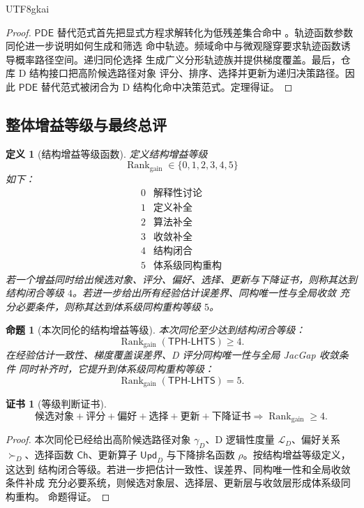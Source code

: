 \documentclass[12pt]{article}
\newtheorem{definition}{定义}[section]
\newtheorem{proposition}{命题}[section]
\newtheorem{Certificate}{证书}[section]
\newcommand{\TPHLHTS}{\ensuremath{\mathsf{TPH\mbox{-}LHTS}}}
\newcommand{\PDE}{\ensuremath{\mathsf{PDE}}}
\begin{document}
\begin{CJK*}{UTF8}{gkai}
\begin{proof}
\(\PDE\) 替代范式首先把显式方程求解转化为低残差集合命中
\cite{RepoTex55PDEParadigm}。轨迹函数参数同伦进一步说明如何生成和筛选
命中轨迹。频域命中与微观隧穿要求轨迹函数诱导概率路径空间。递归同伦选择
生成广义分形轨迹族并提供梯度覆盖。最后，仓库 D 结构接口把高阶候选路径对象
评分、排序、选择并更新为递归决策路径。因此 \(\PDE\) 替代范式被闭合为
D 结构化命中决策范式。定理得证。
\end{proof}

\subsection{整体增益等级与最终总评}
\label{subsec:total-gain-rank-final-statement}

\begin{definition}[结构增益等级函数]
定义结构增益等级
\[
\operatorname{Rank}_{\mathrm{gain}}\in\{0,1,2,3,4,5\}
\]
如下：
\[
\begin{array}{c|l}
0 & \text{解释性讨论}\\
1 & \text{定义补全}\\
2 & \text{算法补全}\\
3 & \text{收敛补全}\\
4 & \text{结构闭合}\\
5 & \text{体系级同构重构}
\end{array}
\]
若一个增益同时给出候选对象、评分、偏好、选择、更新与下降证书，则称其达到
结构闭合等级 \(4\)。若进一步给出所有经验估计误差界、同构唯一性与全局收敛
充分必要条件，则称其达到体系级同构重构等级 \(5\)。
\end{definition}

\begin{proposition}[本次同伦的结构增益等级]
本次同伦至少达到结构闭合等级：
\[
\boxed{
\operatorname{Rank}_{\mathrm{gain}}(\TPHLHTS)\ge4.
}
\]
在经验估计一致性、梯度覆盖误差界、D 评分同构唯一性与全局 JacGap 收敛条件
同时补齐时，它提升到体系级同构重构等级：
\[
\boxed{
\operatorname{Rank}_{\mathrm{gain}}(\TPHLHTS)=5.
}
\]
\end{proposition}

\begin{Certificate}[等级判断证书]
\[
\boxed{
\text{候选对象}
+\text{评分}
+\text{偏好}
+\text{选择}
+\text{更新}
+\text{下降证书}
\Rightarrow
\operatorname{Rank}_{\mathrm{gain}}\ge4.
}
\]
\end{Certificate}

\begin{proof}
本次同伦已经给出高阶候选路径对象 \(\gamma_D\)、D 逻辑性度量
\(\mathcal L_D\)、偏好关系 \(\succ_D\)、选择函数 \(\mathsf{Ch}\)、更新算子
\(\mathsf{Upd}_D\) 与下降排名函数 \(\rho\)。按结构增益等级定义，这达到
结构闭合等级。若进一步把估计一致性、误差界、同构唯一性和全局收敛条件补成
充分必要系统，则候选对象层、选择层、更新层与收敛层形成体系级同构重构。
命题得证。
\end{proof}


\end{CJK*}
\end{document}
